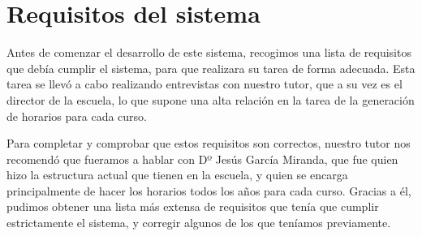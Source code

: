 

\section{Requisitos del sistema}

Antes de comenzar el desarrollo de este sistema, recogimos una lista de requisitos que debía cumplir el sistema, para que realizara su tarea de forma adecuada. Esta tarea se llevó a cabo realizando entrevistas con nuestro tutor, que a su vez es el director de la escuela, lo que supone una alta relación en la tarea de la generación de horarios para cada curso. 

Para completar y comprobar que estos requisitos son correctos, nuestro tutor nos recomendó que fueramos a hablar con Dº Jesús García Miranda, que fue quien hizo la estructura actual que tienen en la escuela, y quien se encarga principalmente de hacer los horarios todos los años para cada curso. Gracias a él, pudimos obtener una lista más extensa de requisitos que tenía que cumplir estrictamente el sistema, y corregir algunos de los que teníamos previamente. 

